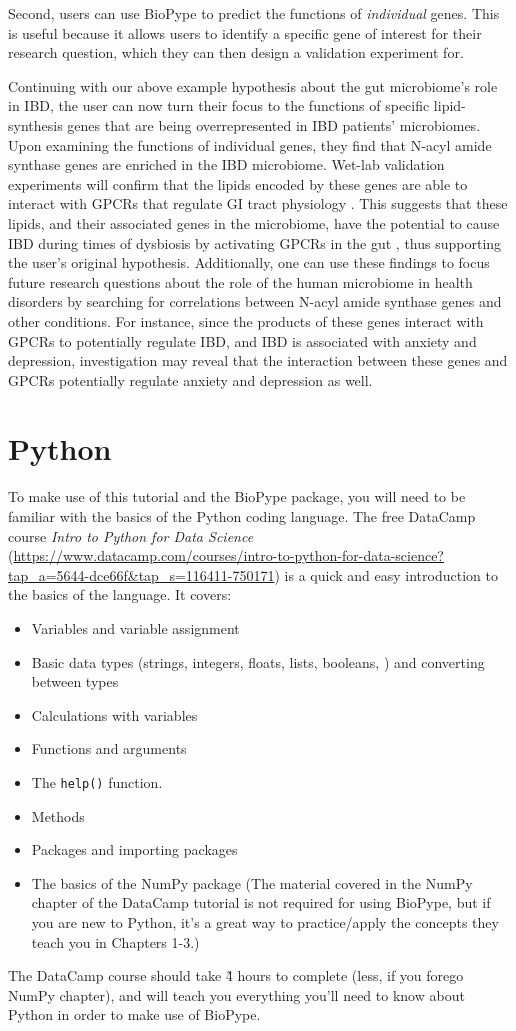 {Second, users can use BioPype to predict the functions of \textit{individual} genes. This is useful because it allows users to identify a specific gene of interest for their research question, which they can then design a validation experiment for. 

Continuing with our above example hypothesis about the gut microbiome's role in IBD, the user can now turn their focus to the functions of specific lipid-synthesis genes that are being overrepresented in IBD patients' microbiomes. Upon examining the functions of individual genes, they find that N-acyl amide synthase genes are enriched in the IBD microbiome. Wet-lab validation experiments will confirm that the lipids encoded by these genes are able to interact with GPCRs that regulate GI tract physiology \citep{Cohen2017}. This suggests that these lipids, and their associated genes in the microbiome, have the potential to cause IBD during times of dysbiosis by activating GPCRs in the gut \citep{Cohen2017}, thus supporting the user's original hypothesis. Additionally, one can use these findings to focus future research questions about the role of the human microbiome in health disorders by searching for correlations between N-acyl amide synthase genes and other conditions. For instance, since the products of these genes interact with GPCRs to potentially regulate IBD, and IBD is associated with anxiety and depression, investigation may reveal that the interaction between these genes and GPCRs potentially regulate anxiety and depression as well.

%
\section{Python}
To make use of this tutorial and the BioPype package, you will need to be familiar with the basics of the Python coding language. The free DataCamp course \textit{Intro to Python for Data Science} (\url{https://www.datacamp.com/courses/intro-to-python-for-data-science?tap_a=5644-dce66f&tap_s=116411-750171}) is a quick and easy introduction to the basics of the language. It covers:
%
\begin{itemize}
\item Variables and variable assignment
\item Basic data types (strings, integers, floats, lists, booleans, ) and converting between types
\item Calculations with variables
\item Functions and arguments
\item The \verb|help()| function.
\item Methods
\item Packages and importing packages
\item The basics of the NumPy package (The material covered in the NumPy chapter of the DataCamp tutorial is not required for using BioPype, but if you are new to Python,  it's a great way to practice/apply the concepts they teach you in Chapters 1-3.)
\end{itemize}
%
The DataCamp course should take \~4 hours to complete (less, if you forego NumPy chapter), and will teach you everything you'll need to know about Python in order to make use of BioPype. 

}
